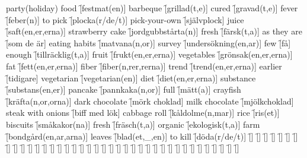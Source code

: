 \begin{questions}
\begin{multicols}{2}
        \question party(holiday) food \f[festmat(en)]
        \question barbeque \f[grillad(t,e)]
        \question cured \f[gravad(t,e)]
        \question fever \f[feber(n)]
        \question to pick \f[plocka(r/de/t)]
        \question pick-your-own \f[självplock]
        \question juice \f[saft(en,er,erna)]
        \question strawberry cake \f[jordgubbstårta(n)]
        \question fresh \f[färsk(t,a)]
        \question as they are \f[som de är]
        \question eating habits \f[matvana(n,or)]
        \question survey \f[undersökning(en,ar)]
        \question few \f[få]
        \question enough \f[tillräcklig(t,a)]
        \question fruit \f[frukt(en,er,erna)]
        \question vegetables \f[grönsak(en,er,erna)]
        \question fat \f[fett(en,er,erna)]
        \question fiber \f[fiber(n,rer,rerna)]
        \question trend \f[trend(en,er,erna)]
        \question earlier \f[tidigare]
        \question vegetarian \f[vegetarian(en)]
        \question diet \f[diet(en,er,erna)]
        \question substance \f[substans(en,er)]
        \question pancake \f[pannkaka(n,or)]
        \question full \f[mätt(a)]
        \question crayfish \f[kräfta(n,or,orna)]
        \question dark chocolate \f[mörk choklad]
        \question milk chocolate \f[mjölkchoklad]
        \question steak with onions \f[biff med lök]
        \question cabbage roll \f[kåldolme(n,mar)]
        \question rice \f[ris(et)]
        \question biscuits \f[småkakor(na)]
        \question fresh \f[fräsch(t,a)]
        \question organic \f[ekologisk(t,a)]
        \question farm \f[bondgård(en,ar,arna)]
        \question leaves \f[blad(et,\_,en)]
        \question to kill \f[döda(r/de/t)]
        \question  \f[]
        \question  \f[]
        \question  \f[]
        \question  \f[]
        \question  \f[]
        \question  \f[]
        \question  \f[]
        \question  \f[]
        \question  \f[]
        \question  \f[]
        \question  \f[]
        \question  \f[]
        \question  \f[]
        \question  \f[]
        \question  \f[]
        \question  \f[]
        \question  \f[]
        \question  \f[]
        \question  \f[]
        \question  \f[]
        \question  \f[]
        \question  \f[]
        \question  \f[]
        \question  \f[]
        \question  \f[]
        \question  \f[]
        \question  \f[]
        \question  \f[]
        \question  \f[]
        \question  \f[]
        \question  \f[]
        \question  \f[]
        \question  \f[]
        \question  \f[]
        \question  \f[]
        \question  \f[]
        \question  \f[]
        \question  \f[]
        \question  \f[]

\end{multicols}
\end{questions}
